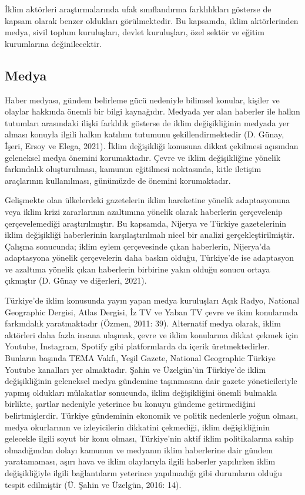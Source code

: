 \documentclass[
]{book}
\begin{document}
İklim aktörleri araştırmalarında ufak sınıflandırma farklılıkları gösterse de kapsam olarak benzer oldukları görülmektedir. Bu kapsamda, iklim aktörlerinden medya, sivil toplum kuruluşları, devlet kuruluşları, özel sektör ve eğitim kurumlarına değinilecektir.

\hypertarget{medya}{%
\subsection{Medya}\label{medya}}

Haber medyası, gündem belirleme gücü nedeniyle bilimsel konular, kişiler ve olaylar hakkında önemli bir bilgi kaynağıdır. Medyada yer alan haberler ile halkın tutumları arasındaki ilişki farklılık gösterse de iklim değişikliğinin medyada yer alması konuyla ilgili halkın katılımı tutumunu şekillendirmektedir (D. Günay, İşeri, Ersoy ve Elega, 2021). İklim değişikliği konusuna dikkat çekilmesi açısından geleneksel medya önemini korumaktadır. Çevre ve iklim değişikliğine yönelik farkındalık oluşturulması, kamunun eğitilmesi noktasında, kitle iletişim araçlarının kullanılması, günümüzde de önemini korumaktadır.

Gelişmekte olan ülkelerdeki gazetelerin iklim hareketine yönelik adaptasyonuna veya iklim krizi zararlarının azaltımına yönelik olarak haberlerin çerçevelenip çerçevelemediği araştırılmıştır. Bu kapsamda, Nijerya ve Türkiye gazetelerinin iklim değişikliği haberlerinin karşılaştırılmalı nicel bir analizi gerçekleştirilmiştir. Çalışma sonucunda; iklim eylem çerçevesinde çıkan haberlerin, Nijerya'da adaptasyona yönelik çerçevelerin daha baskın olduğu, Türkiye'de ise adaptasyon ve azaltıma yönelik çıkan haberlerin birbirine yakın olduğu sonucu ortaya çıkmıştır (D. Günay ve diğerleri, 2021).

Türkiye'de iklim konusunda yayın yapan medya kuruluşları Açık Radyo, National Geographic Dergisi, Atlas Dergisi, İz TV ve Yaban TV çevre ve ikim konularında farkındalık yaratmaktadır (Özmen, 2011: 39). Alternatif medya olarak, iklim aktörleri daha fazla insana ulaşmak, çevre ve iklim konularına dikkat çekmek için Youtube, Instagram, Spotify gibi platformlarda da içerik üretmektedirler. Bunların başında TEMA Vakfı, Yeşil Gazete, National Geographic Türkiye Youtube kanalları yer almaktadır.
Şahin ve Üzelgün'ün Türkiye'de iklim değişikliğinin geleneksel medya gündemine taşınmasına dair gazete yöneticileriyle yapmış oldukları mülakatlar sonucunda, iklim değişikliğini önemli bulmakla birlikte, şartlar nedeniyle yeterince bu konuyu gündeme getirmediğini belirtmişlerdir. Türkiye gündeminin ekonomik ve politik nedenlerle yoğun olması, medya okurlarının ve izleyicilerin dikkatini çekmediği, iklim değişikliğinin gelecekle ilgili soyut bir konu olması, Türkiye'nin aktif iklim politikalarına sahip olmadığından dolayı kamunun ve medyanın iklim haberlerine dair gündem yaratamaması, aşırı hava ve iklim olaylarıyla ilgili haberler yapılırken iklim değişikliğiyle ilgili bağlantıların yeterince yapılmadığı gibi durumların olduğu tespit edilmiştir (Ü. Şahin ve Üzelgün, 2016: 14).
\end{document}
